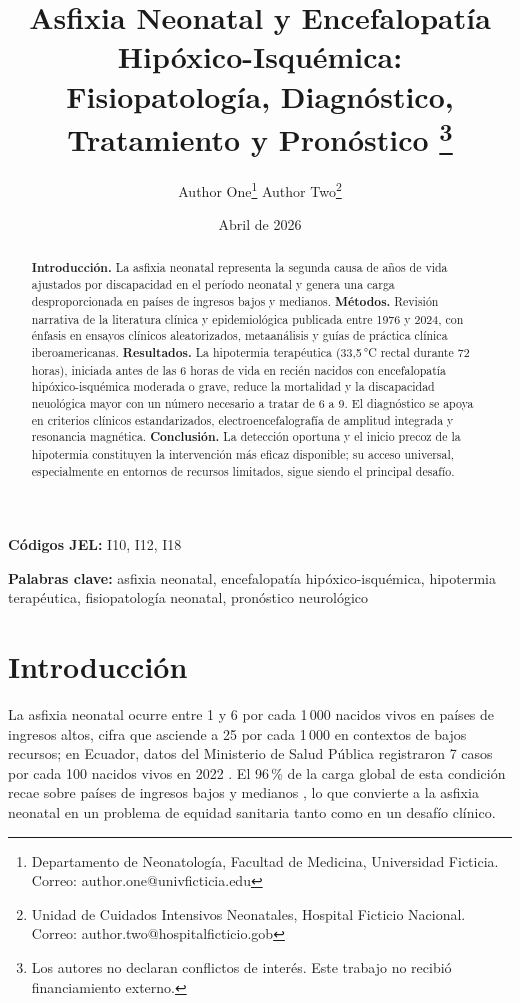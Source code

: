 \documentclass[12pt]{article}
\title{Asfixia Neonatal y Encefalopatía Hipóxico-Isquémica:\\
       Fisiopatología, Diagnóstico, Tratamiento y Pronóstico%
       \thanks{Los autores no declaran conflictos de interés.
               Este trabajo no recibió financiamiento externo.}}
\author{
  Author One\thanks{Departamento de Neonatología, Facultad de Medicina,
  Universidad Ficticia. Correo: author.one@univficticia.edu} \quad
  Author Two\thanks{Unidad de Cuidados Intensivos Neonatales,
  Hospital Ficticio Nacional. Correo: author.two@hospitalficticio.gob}
}
\date{Abril de 2026}
\begin{document}

\maketitle
\thispagestyle{empty}

\begin{abstract}
\noindent \singlespacing
\textbf{Introducción.} La asfixia neonatal representa la segunda causa de años de vida
ajustados por discapacidad en el período neonatal y genera una carga desproporcionada
en países de ingresos bajos y medianos.
\textbf{Métodos.} Revisión narrativa de la literatura clínica y epidemiológica publicada
entre 1976 y 2024, con énfasis en ensayos clínicos aleatorizados, metaanálisis y guías
de práctica clínica iberoamericanas.
\textbf{Resultados.} La hipotermia terapéutica (33,5\,°C rectal durante 72 horas),
iniciada antes de las 6 horas de vida en recién nacidos con encefalopatía
hipóxico-isquémica moderada o grave, reduce la mortalidad y la discapacidad
neuológica mayor con un número necesario a tratar de 6 a 9.
El diagnóstico se apoya en criterios clínicos estandarizados, electroencefalografía
de amplitud integrada y resonancia magnética.
\textbf{Conclusión.} La detección oportuna y el inicio precoz de la hipotermia
constituyen la intervención más eficaz disponible; su acceso universal, especialmente
en entornos de recursos limitados, sigue siendo el principal desafío.
\end{abstract}

\vspace{1em}
\noindent \textbf{Códigos JEL:} I10, I12, I18

\vspace{0.5em}
\noindent \textbf{Palabras clave:} asfixia neonatal, encefalopatía hipóxico-isquémica,
hipotermia terapéutica, fisiopatología neonatal, pronóstico neurológico

\newpage
\setcounter{page}{1}

\section{Introducción}
\label{sec:introduccion}

La asfixia neonatal ocurre entre 1 y 6 por cada 1\,000 nacidos vivos en países de
ingresos altos, cifra que asciende a 25 por cada 1\,000 en contextos de bajos recursos;
en Ecuador, datos del Ministerio de Salud Pública registraron 7 casos por cada 100
nacidos vivos en 2022 \parencite{ecuador2022}. El 96\,\% de la carga global de esta
condición recae sobre países de ingresos bajos y medianos \parencite{kurinczuk2010},
lo que convierte a la asfixia neonatal en un problema de equidad sanitaria tanto como
en un desafío clínico.
\end{document}
